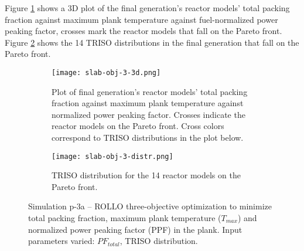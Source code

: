 Figure \ref{fig:slab-obj-3-3d} shows a 3D plot of the final generation's reactor models' 
total packing fraction against maximum plank temperature against fuel-normalized power 
peaking factor, crosses mark the reactor models that fall on the Pareto front.
Figure \ref{fig:slab-obj-3-distr} shows the 14 TRISO distributions in 
the final generation that fall on the Pareto front. 
\begin{figure}[htbp!]
    \begin{subfigure}{\textwidth}
        \centering
        \texttt{[image: slab-obj-3-3d.png]}
        \caption{Plot of final generation's reactor models' total packing fraction against maximum plank 
        temperature against normalized power peaking factor. Crosses indicate the reactor models on the 
        Pareto front. Cross colors correspond to TRISO distributions in the plot below.}
        \label{fig:slab-obj-3-3d} 
    \end{subfigure}
    \begin{subfigure}{\textwidth}
        \texttt{[image: slab-obj-3-distr.png]}
        \caption{TRISO distribution for the 14 reactor models on the Pareto front.}
        \label{fig:slab-obj-3-distr} 
    \end{subfigure}
    \caption{Simulation p-3a -- ROLLO three-objective optimization to minimize total packing fraction, 
    maximum plank temperature ($T_{max}$) and normalized power peaking factor (PPF) in the plank. 
    Input parameters varied: $PF_{total}$, TRISO distribution.}
    \label{fig:slab-obj-3}
\end{figure}


